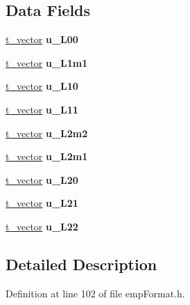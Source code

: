 \subsection*{Data Fields}
\begin{DoxyCompactItemize}
\item 
\hyperlink{structt__vector}{t\+\_\+vector} {\bfseries u\+\_\+\+L00}\hypertarget{structt__lightprobe_aa1df669bd66a1ab4d93386bcc3155bb1}{}\label{structt__lightprobe_aa1df669bd66a1ab4d93386bcc3155bb1}

\item 
\hyperlink{structt__vector}{t\+\_\+vector} {\bfseries u\+\_\+\+L1m1}\hypertarget{structt__lightprobe_a2da8f0bca2bb1b2cba58cb867ceb80ba}{}\label{structt__lightprobe_a2da8f0bca2bb1b2cba58cb867ceb80ba}

\item 
\hyperlink{structt__vector}{t\+\_\+vector} {\bfseries u\+\_\+\+L10}\hypertarget{structt__lightprobe_a423eba4e069ff4859c4acaa984b2f0a2}{}\label{structt__lightprobe_a423eba4e069ff4859c4acaa984b2f0a2}

\item 
\hyperlink{structt__vector}{t\+\_\+vector} {\bfseries u\+\_\+\+L11}\hypertarget{structt__lightprobe_affa250fbba074588afae8d29ff6fdcd3}{}\label{structt__lightprobe_affa250fbba074588afae8d29ff6fdcd3}

\item 
\hyperlink{structt__vector}{t\+\_\+vector} {\bfseries u\+\_\+\+L2m2}\hypertarget{structt__lightprobe_a69b2e896a26b7a41e94e93fc2a5059da}{}\label{structt__lightprobe_a69b2e896a26b7a41e94e93fc2a5059da}

\item 
\hyperlink{structt__vector}{t\+\_\+vector} {\bfseries u\+\_\+\+L2m1}\hypertarget{structt__lightprobe_a42f72ff5e0ae59c120fb4528f722d44d}{}\label{structt__lightprobe_a42f72ff5e0ae59c120fb4528f722d44d}

\item 
\hyperlink{structt__vector}{t\+\_\+vector} {\bfseries u\+\_\+\+L20}\hypertarget{structt__lightprobe_acdd54117fcb867cec226836fa4cbd268}{}\label{structt__lightprobe_acdd54117fcb867cec226836fa4cbd268}

\item 
\hyperlink{structt__vector}{t\+\_\+vector} {\bfseries u\+\_\+\+L21}\hypertarget{structt__lightprobe_af329fe7e8c75f1f8d92c9ba55f7599ac}{}\label{structt__lightprobe_af329fe7e8c75f1f8d92c9ba55f7599ac}

\item 
\hyperlink{structt__vector}{t\+\_\+vector} {\bfseries u\+\_\+\+L22}\hypertarget{structt__lightprobe_ad9f60d1d51a773f235338fb8cea18dec}{}\label{structt__lightprobe_ad9f60d1d51a773f235338fb8cea18dec}

\end{DoxyCompactItemize}


\subsection{Detailed Description}


Definition at line 102 of file emp\+Format.\+h.

